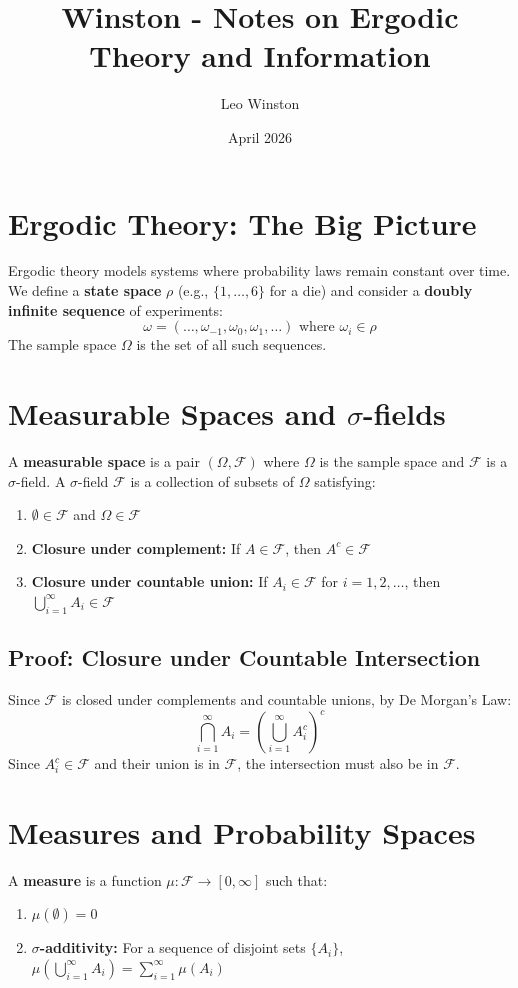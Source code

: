 \documentclass{article}
\title{Winston - Notes on Ergodic Theory and Information}
\author{Leo Winston}
\date{April 2026}
\begin{document}
\maketitle

\section{Ergodic Theory: The Big Picture}
Ergodic theory models systems where probability laws remain constant over time. We define a \textbf{state space} $\rho$ (e.g., $\{1, \dots, 6\}$ for a die) and consider a \textbf{doubly infinite sequence} of experiments:
\[ \omega = (\dots, \omega_{-1}, \omega_0, \omega_1, \dots) \text{ where } \omega_i \in \rho \]
The sample space $\Omega$ is the set of all such sequences.

\section{Measurable Spaces and $\sigma$-fields}
A \textbf{measurable space} is a pair $(\Omega, \mathscr{F})$ where $\Omega$ is the sample space and $\mathscr{F}$ is a $\sigma$-field.
A $\sigma$-field $\mathscr{F}$ is a collection of subsets of $\Omega$ satisfying:
\begin{enumerate}
    \item $\emptyset \in \mathscr{F}$ and $\Omega \in \mathscr{F}$
    \item \textbf{Closure under complement:} If $A \in \mathscr{F}$, then $A^c \in \mathscr{F}$
    \item \textbf{Closure under countable union:} If $A_i \in \mathscr{F}$ for $i=1, 2, \dots$, then $\bigcup_{i=1}^\infty A_i \in \mathscr{F}$
\end{enumerate}

\subsection{Proof: Closure under Countable Intersection}
Since $\mathscr{F}$ is closed under complements and countable unions, by De Morgan's Law:
\[ \bigcap_{i=1}^\infty A_i = \left( \bigcup_{i=1}^\infty A_i^c \right)^c \]
Since $A_i^c \in \mathscr{F}$ and their union is in $\mathscr{F}$, the intersection must also be in $\mathscr{F}$.

\section{Measures and Probability Spaces}
A \textbf{measure} is a function $\mu: \mathscr{F} \to [0, \infty]$ such that:
\begin{enumerate}
    \item $\mu(\emptyset) = 0$
    \item \textbf{$\sigma$-additivity:} For a sequence of disjoint sets $\{A_i\}$, $\mu(\bigcup_{i=1}^\infty A_i) = \sum_{i=1}^\infty \mu(A_i)$
\end{enumerate}
\end{document}
